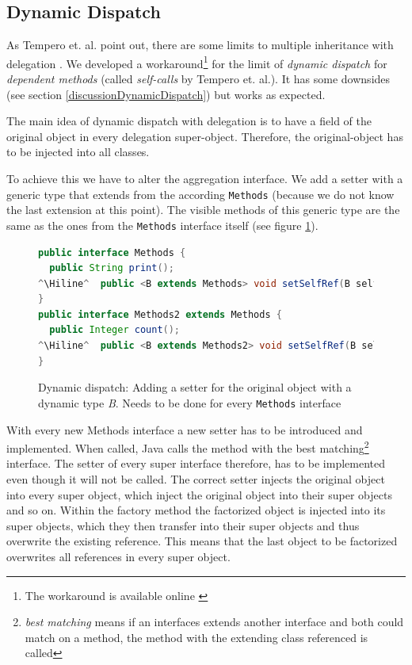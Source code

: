 \documentclass{report}
\newcommand{\Hiline}{\makebox[0pt][l]{\color[rgb]{1,0.96,0.98}\rule[-4pt]{\linewidth}{12.5pt}}}
\begin{document}
\subsection{Dynamic Dispatch}
\label{dynamicDispatch}

As Tempero et. al. point out, there are some limits to multiple inheritance with delegation \cite{Tempero-Multiple-2000}. We developed a workaround\footnote{The workaround is available online \cite{Peuscher-GitHub-EP-2014}} for the limit of \emph{dynamic dispatch} for \emph{dependent methods} (called \emph{self-calls} by Tempero et. al.). It has some downsides (see section \ref{discussionDynamicDispatch}) but works as expected.

The main idea of dynamic dispatch with delegation is to have a field of the original object in every delegation super-object. Therefore, the original-object has to be injected into all classes.

To achieve this we have to alter the aggregation interface. We add a setter with a generic type that extends from the according \lstinline{Methods} (because we do not know the last extension at this point). The visible methods of this generic type are the same as the ones from the \lstinline{Methods} interface itself (see figure \ref{dynamicDispatchMethods}).

\begin{figure}[H]
\begin{lstlisting}[language=java]
public interface Methods {
  public String print();
^\Hiline^  public <B extends Methods> void setSelfRef(B selfRef);
}
public interface Methods2 extends Methods {
  public Integer count();
^\Hiline^  public <B extends Methods2> void setSelfRef(B selfRef);
}
\end{lstlisting}
\caption{Dynamic dispatch: Adding a setter for the original object with a dynamic type \emph{B}. Needs to be done for every \lstinline{Methods} interface}
\label{dynamicDispatchMethods}
\end{figure}

With every new Methods interface a new setter has to be introduced and implemented. When called, Java calls the method with the best matching\footnote{\emph{best matching} means if an interfaces extends another interface and both could match on a method, the method with the extending class referenced is called} interface. The setter of every super interface therefore, has to be implemented even though it will not be called. The correct setter injects the original object into every super object, which inject the original object into their super objects and so on. Within the factory method the factorized object is injected into its super objects, which they then transfer into their super objects and thus overwrite the existing reference. This means that the last object to be factorized overwrites all references in every super object.
\end{document}
